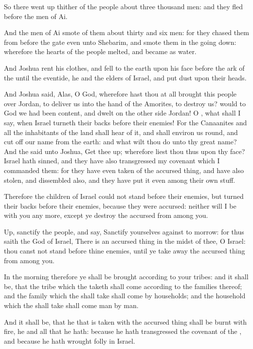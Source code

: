 \Verse So there went up thither of the people about three thousand men: and they fled before the men of Ai.

\Verse And the men of Ai smote of them about thirty and six men: for they chased them from before the gate even unto Shebarim, and smote them in the going down: wherefore the hearts of the people melted, and became as water.

\Verse And Joshua rent his clothes, and fell to the earth upon his face before the ark of the \LORD until the eventide, he and the elders of Israel, and put dust upon their heads.

\Verse And Joshua said, Alas, O \LORD God, wherefore hast thou at all brought this people over Jordan, to deliver us into the hand of the Amorites, to destroy us? would to God we had been content, and dwelt on the other side Jordan!  \Verse O \LORD, what shall I say, when Israel turneth their backs before their enemies!  \Verse For the Canaanites and all the inhabitants of the land shall hear of it, and shall environ us round, and cut off our name from the earth: and what wilt thou do unto thy great name?  \Verse And the \LORD said unto Joshua, Get thee up; wherefore liest thou thus upon thy face?  \Verse Israel hath sinned, and they have also transgressed my covenant which I commanded them: for they have even taken of the accursed thing, and have also stolen, and dissembled also, and they have put it even among their own stuff.

\Verse Therefore the children of Israel could not stand before their enemies, but turned their backs before their enemies, because they were accursed: neither will I be with you any more, except ye destroy the accursed from among you.

\Verse Up, sanctify the people, and say, Sanctify yourselves against to morrow: for thus saith the \LORD God of Israel, There is an accursed thing in the midst of thee, O Israel: thou canst not stand before thine enemies, until ye take away the accursed thing from among you.

\Verse In the morning therefore ye shall be brought according to your tribes: and it shall be, that the tribe which the \LORD taketh shall come according to the families thereof; and the family which the \LORD shall take shall come by households; and the household which the \LORD shall take shall come man by man.

\Verse And it shall be, that he that is taken with the accursed thing shall be burnt with fire, he and all that he hath: because he hath transgressed the covenant of the \LORD, and because he hath wrought folly in Israel.


